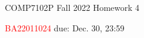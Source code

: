 



\noindent
\hspace*{.2in} COMP7102P Fall 2022
\hfill Homework 4\\
\begin{CJK}{UTF8}{gbsn}
    \hspace*{.2in} \textcolor{red}{BA22011024 \Name{} \ChineseName} \hfill due: Dec. 30, 23:59
\end{CJK}
\bigskip




